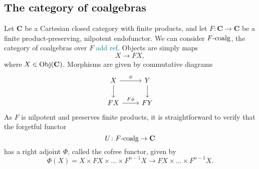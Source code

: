\documentclass[12pt]{article}
\newtheorem{proposition}{Proposition}
\newcommand{\pietro}[1]{\textcolor{teal}{#1}}
\newcommand{\Obj}{{\textnormal{Obj}}}
\newcommand{\Cat}{{\mathbf{C}}}
\newcommand{\FCoalg}{{F\textnormal{-coalg}}}
\begin{document}
\subsection{The category of coalgebras}

Let $\Cat$ be a Cartesian closed category with finite products, and let $F\colon \Cat \rightarrow \Cat$ be a finite product-preserving, nilpotent endofunctor. We can consider $\FCoalg$, the category of coalgebras over $F$ \pietro{add ref}. Objects are simply maps
\begin{equation*}
    X \rightarrow F X,
\end{equation*}
where $X \in \Obj(\Cat)$. Morphisms are given by commutative diagrams
\begin{equation*}
    \begin{tikzcd}
        X \arrow[rightarrow]{d} \arrow[rightarrow]{r}{\phi}
        & Y \arrow[rightarrow]{d} \\
        FX \arrow[rightarrow]{r}{F \phi}
        & FY
    \end{tikzcd}
\end{equation*}
As $F$ is nilpotent and preserves finite products, it is straightforward to verify that the forgetful functor
\begin{equation*}
    U \colon \FCoalg \rightarrow \Cat
\end{equation*}
has a right adjoint $\Phi$, called the cofree functor, given by
\begin{equation*}
    \Phi(X) = X \times F X \times \dots \times F^{n-1} X \rightarrow F X \times \dots \times F^{n-1} X.
\end{equation*}


\end{document}
